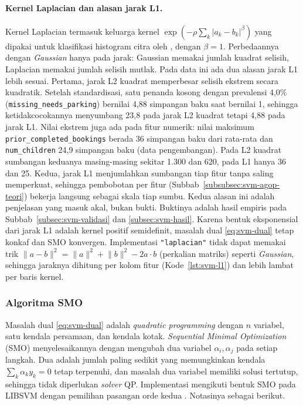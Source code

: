 \paragraph{Kernel Laplacian dan alasan jarak L1.} Kernel Laplacian termasuk keluarga kernel $\exp(-\rho\sum_k |a_k - b_k|^{\beta})$ yang dipakai untuk klasifikasi histogram citra oleh \cite{chapelle1999histogram}, dengan $\beta = 1$. Perbedaannya dengan \textit{Gaussian} hanya pada jarak: Gaussian memakai jumlah kuadrat selisih, Laplacian memakai jumlah selisih mutlak. Pada data ini ada dua alasan jarak L1 lebih sesuai. Pertama, jarak L2 kuadrat memperbesar selisih ekstrem secara kuadratik. Setelah standardisasi, satu penanda kosong dengan prevalensi 4,0\% (\texttt{missing\_needs\_parking}) bernilai 4,88 simpangan baku saat bernilai 1, sehingga ketidakcocokannya menyumbang 23,8 pada jarak L2 kuadrat tetapi 4,88 pada jarak L1. Nilai ekstrem juga ada pada fitur numerik: nilai maksimum \texttt{prior\_completed\_bookings} berada 36 simpangan baku dari rata-rata dan \texttt{num\_children} 24,9 simpangan baku (data pengembangan). Pada L2 kuadrat sumbangan keduanya masing-masing sekitar 1.300 dan 620, pada L1 hanya 36 dan 25. Kedua, jarak L1 menjumlahkan sumbangan tiap fitur tanpa saling memperkuat, sehingga pembobotan per fitur (Subbab~\ref{subsubsec:svm-agop-teori}) bekerja langsung sebagai skala tiap sumbu. Kedua alasan ini adalah penjelasan yang masuk akal, bukan bukti. Buktinya adalah hasil empiris pada Subbab~\ref{subsec:svm-validasi} dan \ref{subsec:svm-hasil}. Karena bentuk eksponensial dari jarak L1 adalah kernel positif semidefinit, masalah dual \eqref{eq:svm-dual} tetap konkaf dan SMO konvergen. Implementasi \texttt{"laplacian"} tidak dapat memakai trik $\lVert a-b\rVert^2 = \lVert a\rVert^2 + \lVert b\rVert^2 - 2a\cdot b$ (perkalian matriks) seperti \textit{Gaussian}, sehingga jaraknya dihitung per kolom fitur (Kode~\ref{lst:svm-l1}) dan lebih lambat per baris kernel.

\subsubsection{Algoritma SMO}
Masalah dual \eqref{eq:svm-dual} adalah \textit{quadratic programming} dengan $n$ variabel, satu kendala persamaan, dan kendala kotak. \textit{Sequential Minimal Optimization} (SMO) \cite{platt1998smo} menyelesaikannya dengan mengubah dua variabel $\alpha_i, \alpha_j$ pada setiap langkah. Dua adalah jumlah paling sedikit yang memungkinkan kendala $\sum_k \alpha_k y_k = 0$ tetap terpenuhi, dan masalah dua variabel memiliki solusi tertutup, sehingga tidak diperlukan \textit{solver} QP. Implementasi mengikuti bentuk SMO pada LIBSVM \cite{chang2011libsvm} dengan pemilihan pasangan orde kedua \cite{fan2005wss}. Notasinya sebagai berikut.

